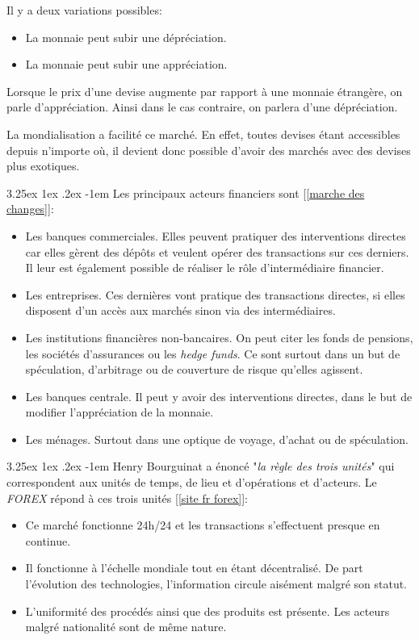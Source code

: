 \documentclass[a4paper, 11pt]{article}
\makeatletter
\renewcommand\paragraph{\@startsection{paragraph}{5}{\z@}%
  {3.25ex \@plus1ex \@minus.2ex}%
  {-1em}%
  {\normalfont\normalsize\bfseries}}
\makeatother
\begin{document}
Il y a deux variations possibles:
\begin{itemize}
\item La monnaie peut subir une dépréciation.
\item La monnaie peut subir une appréciation.
\end{itemize}
Lorsque le prix d'une devise augmente par rapport à une monnaie étrangère, on parle d'appréciation. Ainsi dans le cas contraire, on parlera d'une dépréciation.

La mondialisation a facilité ce marché. En effet, toutes devises étant accessibles depuis n'importe où, il devient donc possible d'avoir des marchés avec des devises plus exotiques.

\paragraph{}
Les principaux acteurs financiers sont [\ref{marche des changes}]:
\begin{itemize}
\item Les banques commerciales. Elles peuvent pratiquer des interventions directes car elles gèrent des dépôts et veulent opérer des transactions sur ces derniers. Il leur est également possible de réaliser le rôle d'intermédiaire financier.
\item Les entreprises. Ces dernières vont pratique des transactions directes, si elles disposent d'un accès aux marchés sinon via des intermédiaires.
\item Les institutions financières non-bancaires. On peut citer les fonds de pensions, les sociétés d'assurances ou les \textit{hedge funds}. Ce sont surtout dans un but de spéculation, d'arbitrage ou de couverture de risque qu'elles agissent.
\item Les banques centrale. Il peut y avoir des interventions directes, dans le but de modifier l'appréciation de la monnaie.
\item Les ménages. Surtout dans une optique de voyage, d'achat ou de spéculation.
\end{itemize}

\paragraph{}
Henry Bourguinat a énoncé "\textit{la règle des trois unités}" qui correspondent aux unités de temps, de lieu et d'opérations et d'acteurs.
Le \textit{FOREX} répond à ces trois unités [\ref{site fr forex}]:
\begin{itemize}
\item Ce marché fonctionne 24h/24 et les transactions s'effectuent presque en continue.
\item Il fonctionne à l'échelle mondiale tout en étant décentralisé. De part l'évolution des technologies, l'information circule aisément malgré son statut.
\item L'uniformité des procédés ainsi que des produits est présente. Les acteurs malgré nationalité sont de même nature.
\end{itemize}
\end{document}
